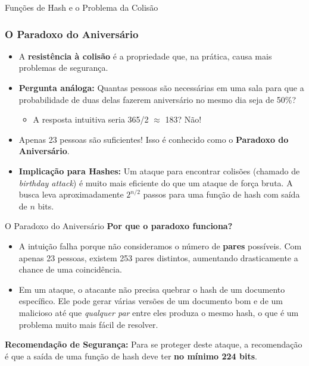 \documentclass{beamer}
\begin{document}
\begin{frame}{Funções de Hash e o Problema da Colisão}
    \frametitle{O Paradoxo do Aniversário}

    \begin{itemize}
        \item A \textbf{resistência à colisão} é a propriedade que, na prática, causa mais problemas de segurança. \pause
        
        \bigskip
        \item \textbf{Pergunta análoga:} Quantas pessoas são necessárias em uma sala para que a probabilidade de duas delas fazerem aniversário no mesmo dia seja de 50\%? \pause
        
        \begin{itemize}
            \item A resposta intuitiva seria 365/2 $\approx$ 183? \pause \alert{Não!}
        \end{itemize}
        
        \bigskip
        \item Apenas \alert{23 pessoas} são suficientes! Isso é conhecido como o \textbf{Paradoxo do Aniversário}. \pause
        
        \bigskip
        \item \textbf{Implicação para Hashes:} Um ataque para encontrar colisões (chamado de \textit{birthday attack}) é muito mais eficiente do que um ataque de força bruta. A busca leva aproximadamente $2^{n/2}$ passos para uma função de hash com saída de $n$ bits. \pause

        
    \end{itemize}
\end{frame}

\begin{frame}{O Paradoxo do Aniversário}
        \textbf{Por que o paradoxo funciona?}
        \begin{itemize}
        \footnotesize
            \item A intuição falha porque não consideramos o número de \textbf{pares} possíveis. Com apenas 23 pessoas, existem 253 pares distintos, aumentando drasticamente a chance de uma coincidência.
            \item Em um ataque, o atacante não precisa quebrar o hash de um documento específico. Ele pode gerar várias versões de um documento bom e de um malicioso até que \textit{qualquer par} entre eles produza o mesmo hash, o que é um problema muito mais fácil de resolver.
        \end{itemize} \pause

        \bigskip
        \textbf{Recomendação de Segurança:} Para se proteger deste ataque, a recomendação é que a saída de uma função de hash deve ter \textbf{no mínimo 224 bits}.

\end{frame}
\end{document}
